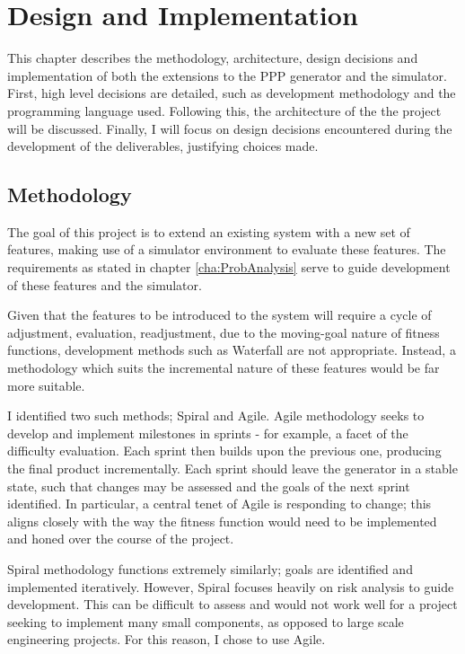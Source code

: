 \documentclass[authoryearcitations]{UoYCSproject}
\begin{document}
\chapter{Design and Implementation}
\label{cha:Design}

This chapter describes the methodology, architecture, design decisions and implementation of both the extensions to the PPP generator and the simulator. First, high level decisions are detailed, such as development methodology and the programming language used. Following this, the architecture of the the project will be discussed. Finally, I will focus on design decisions encountered during the development of the deliverables, justifying choices made.

\section{Methodology}
\label{sec:da_1}

The goal of this project is to extend an existing system with a new set of features, making use of a simulator environment to evaluate these features. The requirements as stated in chapter \ref{cha:ProbAnalysis} serve to guide development of these features and the simulator.

Given that the features to be introduced to the system will require a cycle of adjustment, evaluation, readjustment, due to the moving-goal nature of fitness functions, development methods such as Waterfall are not appropriate. Instead, a methodology which suits the incremental nature of these features would be far more suitable.

I identified two such methods; Spiral and Agile. Agile methodology \cite{agile} seeks to develop and implement milestones in sprints - for example, a facet of the difficulty evaluation. Each sprint then builds upon the previous one, producing the final product incrementally. Each sprint should leave the generator in a stable state, such that changes may be assessed and the goals of the next sprint identified. In particular, a central tenet of Agile is responding to change; this aligns closely with the way the fitness function would need to be implemented and honed over the course of the project.

Spiral methodology \cite{spiral} functions extremely similarly; goals are identified and implemented iteratively. However, Spiral focuses heavily on risk analysis to guide development. This can be difficult to assess and would not work well for a project seeking to implement many small components, as opposed to large scale engineering projects. For this reason, I chose to use Agile.
\end{document}
